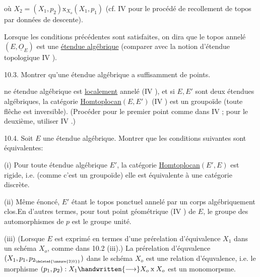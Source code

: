 \margin{\handwritten{$\times$}}
où $X_2=(X_1,p_2)\mathbin{\mathrm{x}}_{X_o}(X_1,p_1)$ (cf. IV  pour le procédé de recollement de topos par données de descente).

Lorsque les conditions précédentes sont satisfaites, on dira que le topos annelé $(E,\underline{O}_E)$ est une \uline{étendue algébrique} (comparer avec la notion d'étendue topologique IV ).
\margin{\handwritten{$\times$}}

10.3. Montrer qu'une étendue algébrique a suffisamment de points.

\margin{\handwritten{$\times$}}
ne étendue algébrique est \uline{localement} annelé (IV ), et si $E,E'$ sont deux étendues algébriques, la catégorie \uline{Homtoplocan}$(E,E')$ (IV ) est un groupoïde (toute flêche est inversible). (Procéder pour le premier point comme dans IV ; pour le deuxième, utiliser IV \hspace{2em}.)
\margin{\handwritten{$\times\quad\times$}}

10.4.  Soit $E$ une étendue algébrique. Montrer que les conditions suivantes sont équivalentes:
\margin{\handwritten{$\times$}}

(i) Pour toute étendue algébrique $E'$, la catégorie  \uline{Homtoplocan}$(E',E)$ est rigide, i.e.  (comme c'est un groupoïde) elle est équivalente à une catégorie discrète.

(ii) Même énoncé, $E'$ étant le topos ponctuel annelé par un corps algébriquement clos.En d'autres termes, pour tout point géométrique (IV ) de $E$, le groupe des automorphismes de $p$ est le groupe unité.
\margin{\handwritten{$\times$}}

(iii) (Lorsque $E$ est exprimé en termes d'une prérelation d'équivalence  $X_1$ dans un schéma $X_o$, comme dans 10.2 (iii).) La prérelation d'équvalence $(X_1,p_1,p_{2_{\deleted{\unsure{2|0}}}})$ dans le schéma $X_o$ est une relation d'équvalence, i.e. le morphisme $(p_1,p_2):X_1\handwritten{\longrightarrow}X_o\mathbin{\mathrm{x}}X_o$ est un monomorpsme.

